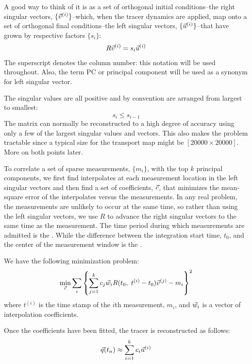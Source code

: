 A good way to think of it is as a set of orthogonal initial conditions--the right singular vectors, $\lbrace \vec v^{(i)} \rbrace$--which, when the tracer dynamics are applied, 
map onto a set of orthogonal final conditions--the left singular vectors, $\lbrace \vec u^{(i)} \rbrace$--that have grown by respective factors $\lbrace s_i \rbrace$:
\begin{equation}
	R \vec v^{(i)} = s_i \vec u^{(i)}
\end{equation}
The superscript denotes the column number: 
this notation will be used throughout.
Also, the term PC or principal component will be used as a synonym for left singular vector.

The singular values are all positive and by convention are arranged from largest to smallest:
\begin{equation}
	s_i \le s_{i-1}
\end{equation}
The matrix can normally be reconstructed to a high degree of accuracy
using only a few of the largest singular values and vectors.
This also makes the problem tractable since a typical size for
the transport map might be $[20000\times20000]$. More on both points later.

To correlate a set of sparse measurements, $\lbrace m_i \rbrace$,
with the top $k$ principal components, we first find interpolates at each
measurement location in the left singular vectors and then find a set
of coefficients, $\vec c$, that minimizes the mean-square error of the
interpolates versus the measurements.
In any real problem, the measurements are unlikely to occur at the same time,
so rather than using the left singular vectors, we use $R$ to advance the
right singular vectors to the same time as the measurement.
The time period during which measurements are admitted is the .
While the difference between the integration start time, $t_0$,
and the center of the measurement window is the .

We have the following minimization problem:
\begin{equation}
\min_{\vec c} \sum_i \left \lbrace \sum_{j=1}^k c_j \vec w_i R(t_0, ~ t^{(i)}-t_0) \vec v^{(j)} - m_i \right \rbrace^2
	\label{PC_proxy_def}
\end{equation}
where $t^{(i)}$ is the time stamp of the $i$th measurement, $m_i$, 
and $\vec w_i$ is a vector of interpolation coefficients.

Once the coefficients have been fitted, the tracer is reconstructed as follows:
\begin{equation}
	\vec q(t_n) \approx \sum_{i=1}^k c_i \vec u^{(i)}
\end{equation}

